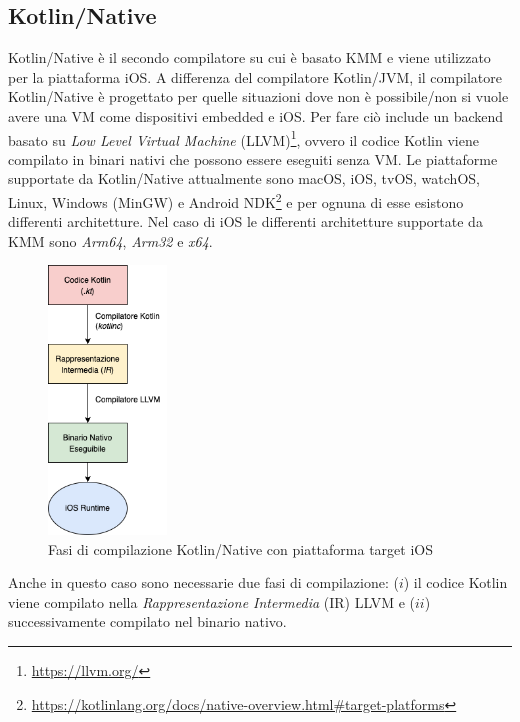 \subsection{Kotlin/Native}
Kotlin/Native è il secondo compilatore su cui è basato KMM e viene utilizzato per la piattaforma iOS. A differenza del compilatore Kotlin/JVM, il compilatore Kotlin/Native è progettato per quelle situazioni dove non è possibile/non si vuole avere una VM come dispositivi embedded e iOS. Per fare ciò include un backend basato su \textit{Low Level Virtual Machine} (LLVM)\footnote{\url{https://llvm.org/}}, ovvero il codice Kotlin viene compilato in binari nativi che possono essere eseguiti senza VM\cite{nagy2022simplifying}. Le piattaforme supportate da Kotlin/Native attualmente sono macOS, iOS, tvOS, watchOS, Linux, Windows (MinGW) e Android NDK\footnote{\url{https://kotlinlang.org/docs/native-overview.html\#target-platforms}} e per ognuna di esse esistono differenti architetture. Nel caso di iOS le differenti architetture supportate da KMM sono \textit{Arm64}, \textit{Arm32} e \textit{x64}.
\begin{figure}[H]
\centering
\includegraphics[width=0.28\textwidth]{img/tesi-10-kotlinnative.drawio.png}
\caption{Fasi di compilazione Kotlin/Native con piattaforma target iOS}
\end{figure}
Anche in questo caso sono necessarie due fasi di compilazione: ($i$) il codice Kotlin viene compilato nella \textit{Rappresentazione Intermedia} (IR) LLVM e ($ii$) successivamente compilato nel binario nativo.

